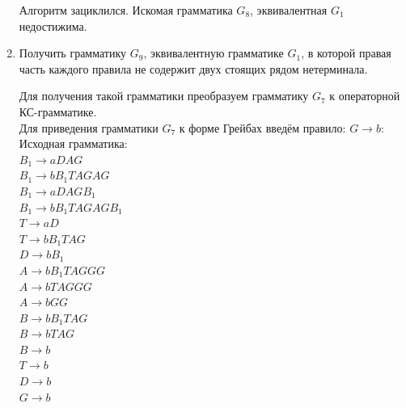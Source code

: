 \documentclass[a4paper,14pt]{extarticle}
\begin{document}
\begin{enumerate}[1.]
Алгоритм зациклился. Искомая грамматика $G_8$, эквивалентная $G_1$ недостижима.
\fi

\item Получить грамматику $G_9$, эквивалентную грамматике $G_1$, в которой
правая часть каждого правила не содержит двух стоящих рядом нетерминала.

Для получения такой грамматики преобразуем грамматику $G_7$ к операторной КС-грамматике.\\
Для приведения грамматики $G_7$ к форме Грейбах введём правило: $G \rightarrow b$:\\
Исходная грамматика:\\
$B_1 \rightarrow aDAG$\\
$B_1 \rightarrow bB_1TAGAG$\\
$B_1 \rightarrow aDAGB_1$\\
$B_1 \rightarrow bB_1TAGAGB_1$\\
$T \rightarrow aD$\\ 
$T \rightarrow bB_1TAG$\\
$D \rightarrow bB_1$\\
$A \rightarrow bB_1TAGGG$\\
$A \rightarrow bTAGGG$\\
$A \rightarrow bGG$\\
$B \rightarrow bB_1TAG$\\ 
$B \rightarrow bTAG$\\ 
$B \rightarrow b$\\
$T \rightarrow b$\\
$D \rightarrow b$\\
$G \rightarrow b$\\


\end{enumerate}
\end{document}
